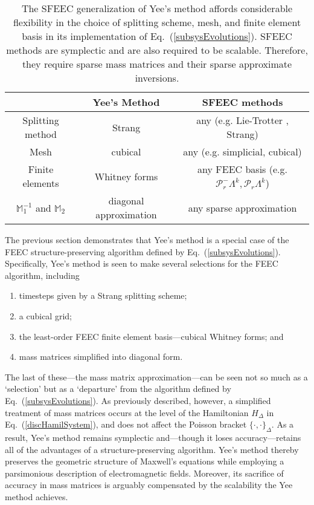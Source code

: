 \documentclass[final,twocolumn]{elsarticle}
\newcommand*\mM{\mathbb{M}}
\newcommand*\mmP{\mathcal{P}}
\begin{document}
\begin{table*}[t!]
\renewcommand{\arraystretch}{1.1}
\centering
\begin{tabular*}{0.787\textwidth}{|c|c|c|}
\hline
 & \textbf{Yee's Method} & \textbf{SFEEC methods}\\
 \hline
Splitting method & Strang & any (e.g. Lie-Trotter \cite{trotter_product_1959}, Strang)\\
 \hline
Mesh & cubical & any (e.g. simplicial, cubical)\\
\hline
Finite elements & Whitney forms & any FEEC basis (e.g. ${\mmP_r^-\Lambda^k,\mmP_r\Lambda^k}$)\\
\hline
$\mM_1^{-1}$ and $\mM_2$  & diagonal approximation & any sparse approximation\\
\hline
\end{tabular*}
\caption{The SFEEC generalization of Yee's method affords considerable flexibility in the choice of splitting scheme, mesh, and finite element basis in its implementation of Eq.~(\ref{subsysEvolutions}). SFEEC methods are symplectic and are also required to be scalable. Therefore, they require sparse mass matrices and their sparse approximate inversions.}
\label{YeeVsSFEEC}
\end{table*}

The previous section demonstrates that Yee's method is a special case of the FEEC structure-preserving algorithm defined by Eq.~(\ref{subsysEvolutions}). Specifically, Yee's method is seen to make several selections for the FEEC algorithm, including
\begin{enumerate}
\item timesteps given by a Strang splitting scheme;
\item a cubical grid;
\item the least-order FEEC finite element basis---cubical Whitney forms; and
\item mass matrices simplified into diagonal form.
\end{enumerate}
The last of these---the mass matrix approximation---can be seen not so much as a `selection' but as a `departure' from the algorithm defined by Eq.~(\ref{subsysEvolutions}). As previously described, however, a simplified treatment of mass matrices occurs at the level of the Hamiltonian $H_\Delta$ in Eq.~(\ref{discHamilSystem}), and does not affect the Poisson bracket ${\{\cdot,\cdot\}_\Delta}$. As a result, Yee's method remains symplectic and---though it loses accuracy---retains all of the advantages of a structure-preserving algorithm. Yee's method thereby preserves the geometric structure of Maxwell's equations while employing a parsimonious description of electromagnetic fields. Moreover, its sacrifice of accuracy in mass matrices is arguably compensated by the scalability the Yee method achieves.
\end{document}

